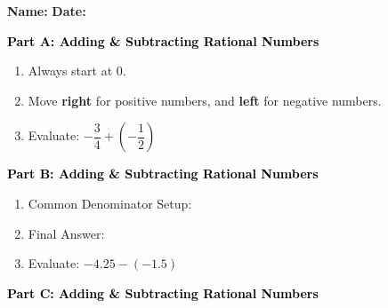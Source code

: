 \documentclass[12pt, letterpaper, fleqn]{article}
\newcommand{\blank}{\underline{\hspace{2.2cm}}}
\newcommand{\blanklong}{\underline{\hspace{6.5cm}}}
\begin{document}
\textbf{Name:} \underline{\hspace{5cm}}
\hfill
\textbf{Date:} \underline{\hspace{3cm}}\\

\begin{tcolorbox}[colback=customteal!20]
\large\textcolor{black}{\textbf{Part A: Adding \& Subtracting Rational Numbers}}
\end{tcolorbox}

\vspace{3mm}

\begin{enumerate}[itemsep=2.2cm, leftmargin=0.6cm]
\item Always start at $0$.
\item Move \textbf{right} for positive numbers, and \textbf{left} for negative numbers.
\item Evaluate: $-\dfrac{3}{4} + \left(-\dfrac{1}{2}\right)$
\vspace{1cm}
\end{enumerate}

\newpage

\begin{tcolorbox}[colback=customteal!20]
\large\textcolor{black}{\textbf{Part B: Adding \& Subtracting Rational Numbers}}
\end{tcolorbox}

\vspace{3mm}

\begin{enumerate}[itemsep=2.2cm, leftmargin=0.6cm, resume]
\item Common Denominator Setup: \blanklong
    \vspace{0.5cm}
\item Final Answer: \blank
\item Evaluate: $-4.25 - (-1.5)$
\vspace{1cm}
\end{enumerate}

\newpage

\begin{tcolorbox}[colback=customteal!20]
\large\textcolor{black}{\textbf{Part C: Adding \& Subtracting Rational Numbers}}
\end{tcolorbox}
\end{document}
